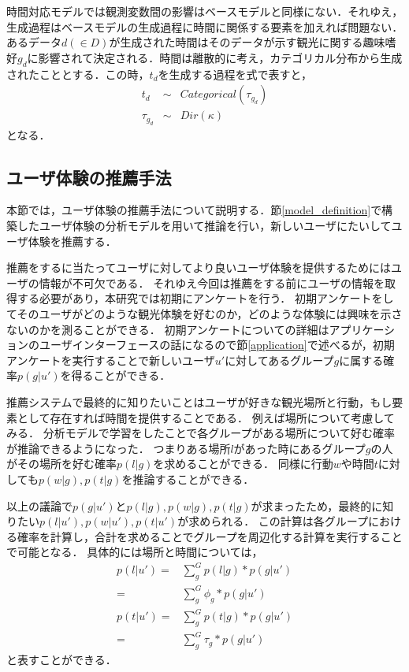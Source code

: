 \documentclass[a4j,10pt, twocolumn]{jarticle}
\begin{document}
時間対応モデルでは観測変数間の影響はベースモデルと同様にない．それゆえ，生成過程はベースモデルの生成過程に時間に関係する要素を加えれば問題ない．
あるデータ$d(\in D)$が生成された時間はそのデータが示す観光に関する趣味嗜好$g_d$に影響されて決定される．時間は離散的に考え，カテゴリカル分布から生成されたこととする．この時，$t_d$を生成する過程を式で表すと，
\begin{eqnarray}
  t_d & \sim & Categorical(\tau_{g_d}) \\
  \tau_{g_d} & \sim & Dir(\kappa)
\end{eqnarray}
となる．

\subsection{ユーザ体験の推薦手法} \label{recommendation}
本節では，ユーザ体験の推薦手法について説明する．節\ref{model_definition}で構築したユーザ体験の分析モデルを用いて推論を行い，新しいユーザにたいしてユーザ体験を推薦する．

推薦をするに当たってユーザに対してより良いユーザ体験を提供するためにはユーザの情報が不可欠である．
それゆえ今回は推薦をする前にユーザの情報を取得する必要があり，本研究では初期にアンケートを行う．
初期アンケートをしてそのユーザがどのような観光体験を好むのか，どのような体験には興味を示さないのかを測ることができる．
初期アンケートについての詳細はアプリケーションのユーザインターフェースの話になるので節\ref{application}で述べるが，初期アンケートを実行することで新しいユーザ$u'$に対してあるグループ$g$に属する確率$p(g|u')$を得ることができる．

推薦システムで最終的に知りたいことはユーザが好きな観光場所と行動，もし要素として存在すれば時間を提供することである．
例えば場所について考慮してみる．
分析モデルで学習をしたことで各グループがある場所について好む確率が推論できるようになった．
つまりある場所$l$があった時にあるグループ$g$の人がその場所を好む確率$p(l|g)$を求めることができる．
同様に行動$w$や時間$t$に対しても$p(w|g), p(t|g)$を推論することができる．

以上の議論で$p(g|u')$と$p(l|g), p(w|g), p(t|g)$が求まったため，最終的に知りたい$p(l|u'), p(w|u'), p(t|u')$が求められる．
この計算は各グループにおける確率を計算し，合計を求めることでグループを周辺化する計算を実行することで可能となる．
具体的には場所と時間については，
\begin{eqnarray}
p(l|u') =& \sum_g^G p(l|g) * p(g|u') \nonumber \\
=& \sum_g^G \phi_g * p(g|u') \\
p(t|u') =& \sum_g^G p(t|g) * p(g|u') \nonumber \\
=& \sum_g^G \tau_g * p(g|u')
\end{eqnarray}
と表すことができる．
\end{document}
